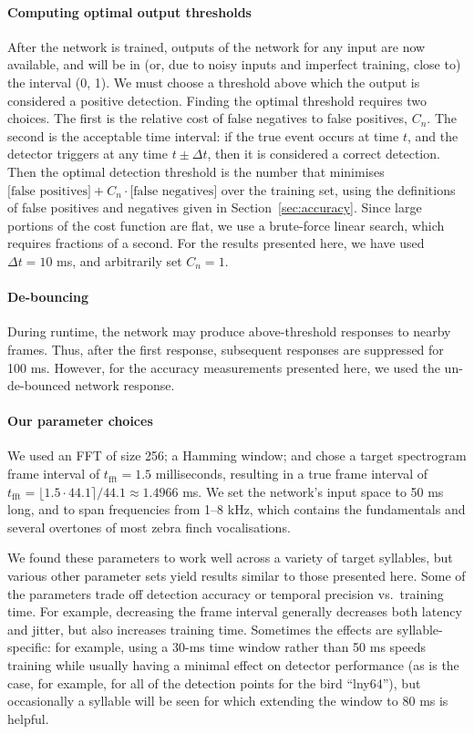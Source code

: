 \documentclass[10pt,letterpaper]{article}
\renewcommand{\subsubsection}[1]{\paragraph{#1}}
\begin{document}
\subsubsection{Computing optimal output thresholds}
\label{sec:optimalthresholds}
After the network is trained, outputs of the network for any input are
now available, and will be in (or, due to noisy inputs and imperfect
training, close to) the interval (0, 1). We must choose a threshold
above which the output is considered a positive detection. Finding the
optimal threshold requires two choices. The first is the relative cost
of false negatives to false positives, $C_n$. The second is the
acceptable time interval: if the true event occurs at time $t$, and
the detector triggers at any time $t\pm\Delta t$, then it is
considered a correct detection. Then the optimal detection threshold
is the number that minimises $\textrm{[false positives]}
+C_n\cdot\textrm{[false negatives]}$ over the training set, using the
definitions of false positives and negatives given in
Section~\ref{sec:accuracy}. Since large portions of the cost function
are flat, we use a brute-force linear search, which requires fractions of a
second. For the results presented here, we have used
$\Delta t=10$ ms, and arbitrarily set $C_n=1$.

\subsubsection{De-bouncing}

During runtime, the network may produce above-threshold responses to
nearby frames.  Thus, after the first response, subsequent responses
are suppressed for 100 ms.  However, for the accuracy measurements
presented here, we used the un-de-bounced network response.

\subsubsection{Our parameter choices}

We used an FFT of size 256; a Hamming window; and chose a target
spectrogram frame interval of $t_\textrm{fft}=1.5$ milliseconds,
resulting in a true frame interval of $t_\textrm{fft}=\lfloor 1.5\cdot
44.1\rceil /44.1\approx 1.4966$ ms.  We set the network's input space
to 50 ms long, and to span frequencies from 1--8 kHz, which contains
the fundamentals and several overtones of most zebra finch
vocalisations.

We found these parameters to work well across a variety of target
syllables, but various other parameter sets yield results similar to
those presented here.  Some of the parameters trade off detection
accuracy or temporal precision vs.~training time. For example,
decreasing the frame interval generally decreases both latency and
jitter, but also increases training time. Sometimes the effects are
syllable-specific: for example, using a 30-ms time window rather than
50 ms speeds training while usually having a minimal effect on
detector performance (as is the case, for example, for all of the
detection points for the bird ``lny64''), but occasionally a syllable will be seen
for which extending the window to 80 ms is helpful.
\end{document}
